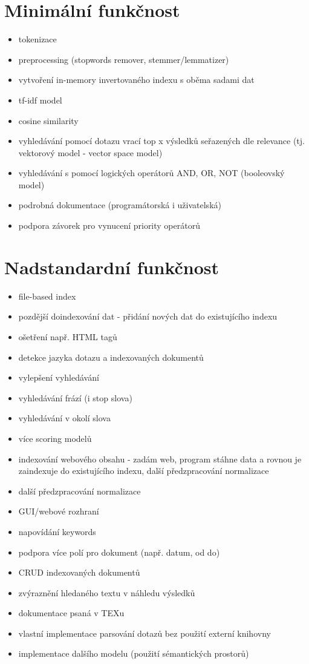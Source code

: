 \documentclass[
12pt,
a4paper,
pdftex,
czech,
titlepage
]{report}
\begin{document}
\section{Minimální funkčnost}
\begin{itemize}
    \item tokenizace
    \item preprocessing (stopwords remover, stemmer/lemmatizer)
    \item vytvoření in-memory invertovaného indexu s oběma sadami dat
    \item tf-idf model
    \item cosine similarity
    \item vyhledávání pomocí dotazu vrací top x výsledků seřazených dle relevance (tj. vektorový model - vector space model)
    \item vyhledávání s pomocí logických operátorů AND, OR, NOT (booleovský model)
    \item podrobná dokumentace (programátorská i uživatelská)
    \item podpora závorek pro vynucení priority operátorů
\end{itemize}
\section{Nadstandardní funkčnost}
\begin{itemize}
    \item file-based index
    \item pozdější doindexování dat - přidání nových dat do existujícího indexu
    \item ošetření např. HTML tagů
    \item detekce jazyka dotazu a indexovaných dokumentů
    \item vylepšení vyhledávání
    \item vyhledávání frází (i stop slova)
    \item vyhledávání v okolí slova
    \item více scoring modelů
    \item indexování webového obsahu - zadám web, program stáhne data a rovnou je zaindexuje do existujícího indexu,
další předzpracování normalizace
    \item další předzpracování normalizace
    \item GUI/webové rozhraní
    \item napovídání keywords
    \item podpora více polí pro dokument (např. datum, od do)
    \item CRUD indexovaných dokumentů
    \item zvýraznění hledaného textu v náhledu výsledků
    \item dokumentace psaná v TEXu
    \item vlastní implementace parsování dotazů bez použití externí knihovny
    \item implementace dalšího modelu (použití sémantických prostorů)
\end{itemize}
\end{document}
